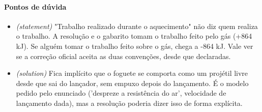 \documentclass{article}%
\begin{document}
\paragraph{Pontos de dúvida}%
\begin{itemize}%
\item%
\textit{(statement)} "Trabalho realizado durante o aquecimento" não diz quem realiza o trabalho. A resolução e o gabarito tomam o trabalho feito pelo gás (+864 kJ). Se alguém tomar o trabalho feito sobre o gás, chega a -864 kJ. Vale ver se a correção oficial aceita as duas convenções, desde que declaradas.%
\item%
\textit{(solution)} Fica implícito que o foguete se comporta como um projétil livre desde que sai do lançador, sem empuxo depois do lançamento. É o modelo pedido pelo enunciado ('despreze a resistência do ar', velocidade de lançamento dada), mas a resolução poderia dizer isso de forma explícita.%
\end{itemize}%
\end{document}
